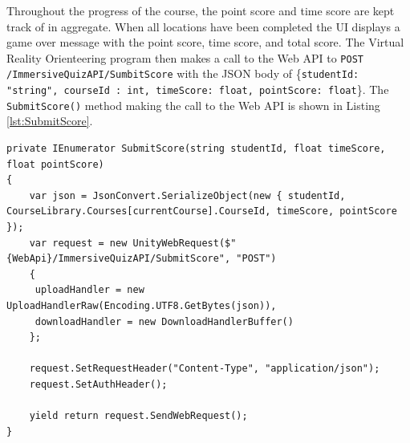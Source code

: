 Throughout the progress of the course, the point score and time score are kept track of in aggregate. When all locations have been completed the UI displays a game over message with the point score, time score, and total score. The Virtual Reality Orienteering program then makes a call to the Web API to \lstinline{POST /ImmersiveQuizAPI/SumbitScore} with the JSON body of \{\lstinline{studentId: "string", courseId : int, timeScore: float, pointScore: float}\}. The \lstinline{SubmitScore()} method making the call to the Web API is shown in Listing \ref{lst:SubmitScore}.
\begin{lstlisting}[caption=Submit Score, label=lst:SubmitScore]
private IEnumerator SubmitScore(string studentId, float timeScore, float pointScore)
{
	var json = JsonConvert.SerializeObject(new { studentId, CourseLibrary.Courses[currentCourse].CourseId, timeScore, pointScore });
	var request = new UnityWebRequest($"{WebApi}/ImmersiveQuizAPI/SubmitScore", "POST")
	{
	 uploadHandler = new UploadHandlerRaw(Encoding.UTF8.GetBytes(json)),
	 downloadHandler = new DownloadHandlerBuffer()
	};
	
	request.SetRequestHeader("Content-Type", "application/json");
	request.SetAuthHeader();
	
	yield return request.SendWebRequest();
}
\end{lstlisting}

